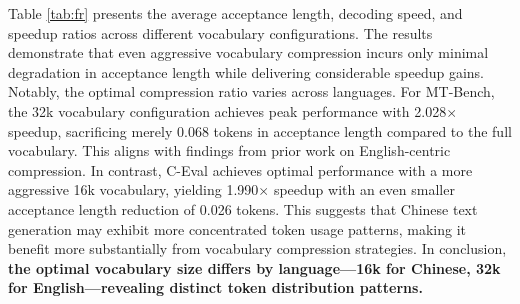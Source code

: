 \documentclass{article} %
\begin{document}
Table \ref{tab:fr} presents the average acceptance length, decoding speed, and speedup ratios across different vocabulary configurations. The results demonstrate that even aggressive vocabulary compression incurs only minimal degradation in acceptance length while delivering considerable speedup gains. Notably, the optimal compression ratio varies across languages. For MT-Bench, the 32k vocabulary configuration achieves peak performance with 2.028$\times$ speedup, sacrificing merely 0.068 tokens in acceptance length compared to the full vocabulary. This aligns with findings from prior work on English-centric compression. In contrast, C-Eval achieves optimal performance with a more aggressive 16k vocabulary, yielding 1.990$\times$ speedup with an even smaller acceptance length reduction of 0.026 tokens. This suggests that Chinese text generation may exhibit more concentrated token usage patterns, making it benefit more substantially from vocabulary compression strategies. In conclusion, \textbf{the optimal vocabulary size differs by language—16k for Chinese, 32k for English—revealing distinct token distribution patterns.}
\end{document}
